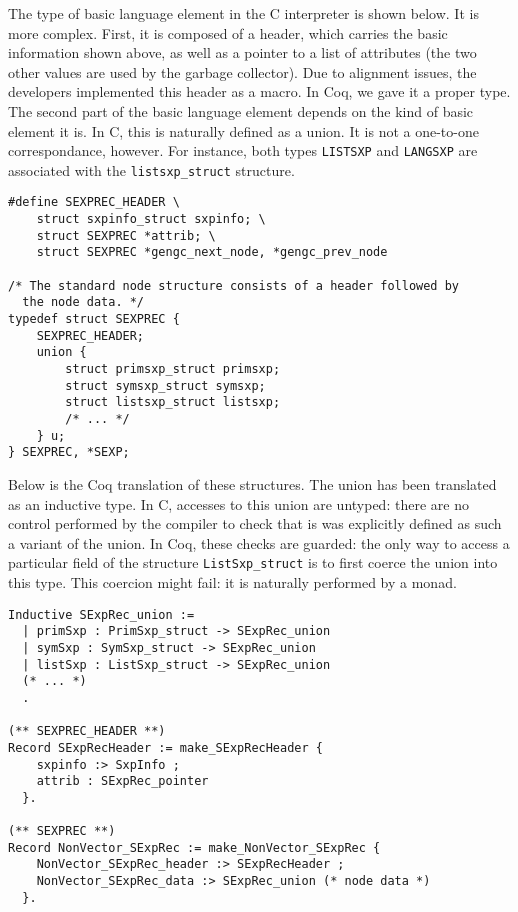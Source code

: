 \documentclass{article}
\newcommand\Coq{Coq}
\newcommand\Cn{C}
\begin{document}
The type of basic language element in the \Cn{} interpreter is shown below.
It is more complex.
First, it is composed of a header,
which carries the basic information shown above,
as well as a pointer to a list of attributes
(the two other values are used by the garbage collector).
Due to alignment issues, the developers implemented this header
as a macro.
In \Coq{}, we gave it a proper type.
The second part of the basic language element
depends on the kind of basic element it is.
In \Cn{}, this is naturally defined as a union.
It is not a one-to-one correspondance, however.
For instance, both types \texttt{LISTSXP} and \texttt{LANGSXP}
are associated with the \texttt{listsxp_struct} structure.
\begin{verbatim}
#define SEXPREC_HEADER \
    struct sxpinfo_struct sxpinfo; \
    struct SEXPREC *attrib; \
    struct SEXPREC *gengc_next_node, *gengc_prev_node

/* The standard node structure consists of a header followed by
  the node data. */
typedef struct SEXPREC {
    SEXPREC_HEADER;
    union {
        struct primsxp_struct primsxp;
        struct symsxp_struct symsxp;
        struct listsxp_struct listsxp;
        /* ... */
    } u;
} SEXPREC, *SEXP;
\end{verbatim}
Below is the \Coq{} translation of these structures.
The union has been translated as an inductive type.
In \Cn{}, accesses to this union are untyped:
there are no control performed by the compiler to check that
is was explicitly defined as such a variant of the union.
In \Coq{}, these checks are guarded:
the only way to access a particular field of the structure
\texttt{ListSxp_struct} is to first coerce
the union into this type.
This coercion might fail:
it is naturally performed by a monad.
\begin{verbatim}
Inductive SExpRec_union :=
  | primSxp : PrimSxp_struct -> SExpRec_union
  | symSxp : SymSxp_struct -> SExpRec_union
  | listSxp : ListSxp_struct -> SExpRec_union
  (* ... *)
  .

(** SEXPREC_HEADER **)
Record SExpRecHeader := make_SExpRecHeader {
    sxpinfo :> SxpInfo ;
    attrib : SExpRec_pointer
  }.

(** SEXPREC **)
Record NonVector_SExpRec := make_NonVector_SExpRec {
    NonVector_SExpRec_header :> SExpRecHeader ;
    NonVector_SExpRec_data :> SExpRec_union (* node data *)
  }.
\end{verbatim}
\end{document}
